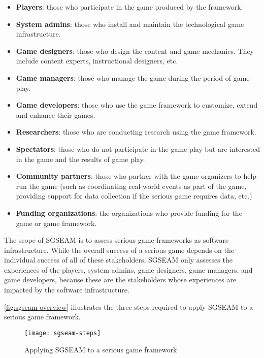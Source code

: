 \begin{itemize}
\item \textbf{Players}: those who participate in the game produced by the framework.
\item \textbf{System admins}: those who install and maintain the technological game infrastructure.
\item \textbf{Game designers}: those who design the content and game mechanics. They include  content experts, instructional designers, etc.
\item \textbf{Game managers}: those who manage the game during the period of game play.
\item \textbf{Game developers}: those who use the game framework to customize, extend and enhance their games.
\item \textbf{Researchers}: those who are conducting research using the game framework.
\item \textbf{Spectators}: those who do not participate in the game play but are interested in the game and the results of game play. 
\item \textbf{Community partners}: those who partner with the game organizers to help run the game (such as coordinating real-world events as part of the game, providing support for data
  collection if the serious game requires data, etc.) 
\item \textbf{Funding organizations}: the organizations who provide funding for the game or game framework.
\end{itemize}

The scope of SGSEAM is to assess serious game frameworks as software infrastructure. While
the overall success of a serious game depends on the individual success of all of these
stakeholders, SGSEAM only assesses the experiences of the players, system admins, game designers, game managers, and game developers, because these are the stakeholders whose experiences are impacted by the software infrastructure. 

\autoref{fig:sgseam-overview} illustrates the three steps required to apply SGSEAM to a serious game framework.

\begin{figure}[ht!]
  \center
  \texttt{[image: sgseam-steps]}
  \caption{Applying SGSEAM to a serious game framework}
  \label{fig:sgseam-overview}
\end{figure}

